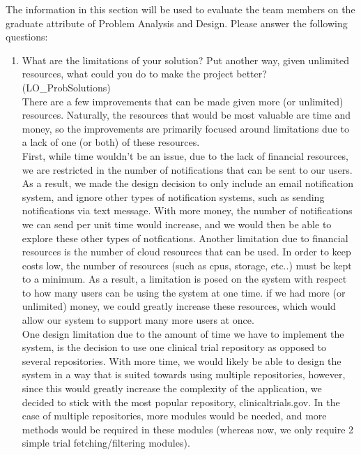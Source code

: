 \documentclass[12pt, titlepage]{article}
\begin{document}
The information in this section will be used to evaluate the team members on the
graduate attribute of Problem Analysis and Design.  Please answer the following questions:

\begin{enumerate}
  \item What are the limitations of your solution?  Put another way, given
  unlimited resources, what could you do to make the project better? (LO\_ProbSolutions)\\

  There are a few improvements that can be made given more (or unlimited) resources. Naturally, the resources that 
  would be most valuable are time and money, so the improvements are primarily focused around limitations due to a lack of 
  one (or both) of these resources.\\

  First, while time wouldn't be an issue, due to the lack of financial resources, we are restricted in the number of notifications that 
  can be sent to our users. As a result, we made the design decision to only include an email notification system, and ignore other types 
  of notification systems, such as sending notifications via text message. With more money, the number of notifications we can send per unit time 
  would increase, and we would then be able to explore these other types of notfications. Another limitation due to financial resources
  is the number of cloud resources that can be used. In order to keep costs low, the number of resources (such as cpus, storage, etc..) must 
  be kept to a minimum. As a result, a limitation is posed on the system with respect to how many users can be using the system at one time. if we had 
  more (or unlimited) money, we could greatly increase these resources, which would allow our system to support many more users at once.\\
  
  One design limitation due to the amount of time we have to implement the system, is the decision to use one clinical trial repository as 
  opposed to several repositories. With more time, we would likely be able to design the system in a way that is suited towards using 
  multiple repositories, however, since this would greatly increase the complexity of the application, we decided to stick with the most 
  popular repository, clinicaltrials.gov. In the case of multiple repositories, more modules would be needed, and more methods would be required 
  in these modules (whereas now, we only require 2 simple trial fetching/filtering modules).


\end{enumerate}
\end{document}
